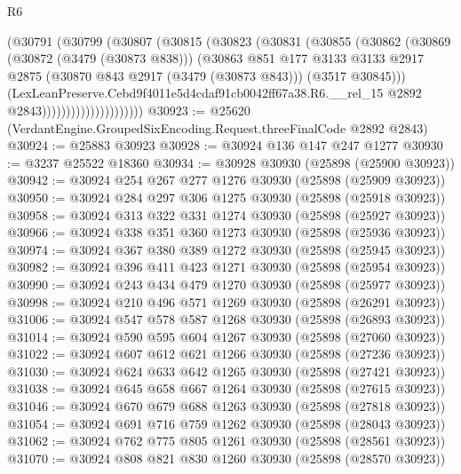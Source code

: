 \begin{lexlean}{R6}
\begin{coremodule}
                            (@30791
                              (@30799
                                (@30807
                                  (@30815
                                    (@30823
                                      (@30831
                                        (@30855
                                          (@30862
                                            (@30869
                                              (@30872 (@3479 (@30873 @838)))
                                              (@30863
                                                @851
                                                @177
                                                @3133
                                                @3133
                                                @2917
                                                @2875
                                                (@30870 @843 @2917 (@3479 (@30873 @843)))
                                                (@3517 @30845)))
                                            (LexLeanPreserve.Cebd9f4011e5d4cdaf91cb0042ff67a38.R6.__rel_15
                                              @2892
                                              @2843)))))))))))))))))))))
@30923 := @25620 (VerdantEngine.GroupedSixEncoding.Request.threeFinalCode @2892 @2843)
@30924 := @25883 @30923
@30928 := @30924 @136 @147 @247 @1277
@30930 := @3237 @25522 @18360
@30934 := @30928 @30930 (@25898 (@25900 @30923))
@30942 := @30924 @254 @267 @277 @1276 @30930 (@25898 (@25909 @30923))
@30950 := @30924 @284 @297 @306 @1275 @30930 (@25898 (@25918 @30923))
@30958 := @30924 @313 @322 @331 @1274 @30930 (@25898 (@25927 @30923))
@30966 := @30924 @338 @351 @360 @1273 @30930 (@25898 (@25936 @30923))
@30974 := @30924 @367 @380 @389 @1272 @30930 (@25898 (@25945 @30923))
@30982 := @30924 @396 @411 @423 @1271 @30930 (@25898 (@25954 @30923))
@30990 := @30924 @243 @434 @479 @1270 @30930 (@25898 (@25977 @30923))
@30998 := @30924 @210 @496 @571 @1269 @30930 (@25898 (@26291 @30923))
@31006 := @30924 @547 @578 @587 @1268 @30930 (@25898 (@26893 @30923))
@31014 := @30924 @590 @595 @604 @1267 @30930 (@25898 (@27060 @30923))
@31022 := @30924 @607 @612 @621 @1266 @30930 (@25898 (@27236 @30923))
@31030 := @30924 @624 @633 @642 @1265 @30930 (@25898 (@27421 @30923))
@31038 := @30924 @645 @658 @667 @1264 @30930 (@25898 (@27615 @30923))
@31046 := @30924 @670 @679 @688 @1263 @30930 (@25898 (@27818 @30923))
@31054 := @30924 @691 @716 @759 @1262 @30930 (@25898 (@28043 @30923))
@31062 := @30924 @762 @775 @805 @1261 @30930 (@25898 (@28561 @30923))
@31070 := @30924 @808 @821 @830 @1260 @30930 (@25898 (@28570 @30923))

\end{coremodule}
\end{lexlean}
